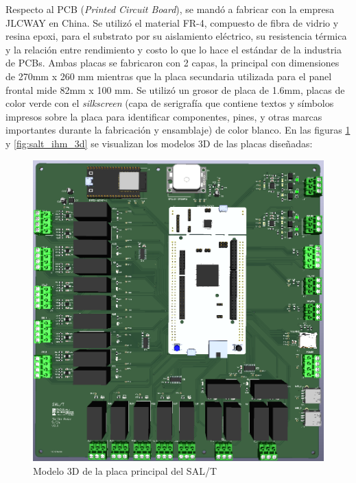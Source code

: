 Respecto al PCB (\textit{Printed Circuit Board}), se mandó a fabricar con la empresa JLCWAY \cite{jlcway} en China. Se utilizó el material FR-4, compuesto de fibra de vidrio y resina epoxi, para el substrato por su aislamiento eléctrico, su resistencia térmica y la relación entre rendimiento y costo lo que lo hace el estándar de la industria de PCBs. Ambas placas se fabricaron con 2 capas, la principal con dimensiones de 270mm x 260 mm mientras que la placa secundaria utilizada para el panel frontal mide 82mm x 100 mm. Se utilizó un grosor de placa de 1.6mm, placas de color verde con el \textit{silkscreen} (capa de serigrafía que contiene textos y símbolos impresos sobre la placa para identificar componentes, pines, y otras marcas importantes durante la fabricación y ensamblaje) de color blanco. En las figuras \ref{fig:salt_3d} y \ref{fig:salt_ihm_3d} se visualizan los modelos 3D de las placas diseñadas: 

\begin{figure}[H]
    \centering
    \includegraphics[width = \linewidth]{img/pcb_3d.png}
    \caption{Modelo 3D de la placa principal del SAL/T}
    \label{fig:salt_3d}
\end{figure}    



